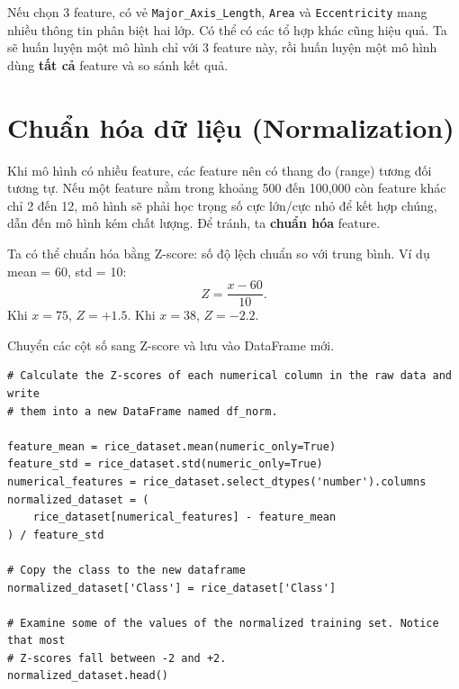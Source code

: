 \documentclass[12pt,a4paper]{article}
\begin{document}
\begin{ynghia}[title={Nhận xét}]
Nếu chọn 3 feature, có vẻ \texttt{Major\_Axis\_Length}, \texttt{Area} và \texttt{Eccentricity} mang nhiều thông tin phân biệt hai lớp.
Có thể có các tổ hợp khác cũng hiệu quả.
Ta sẽ huấn luyện một mô hình chỉ với 3 feature này, rồi huấn luyện một mô hình dùng \textbf{tất cả} feature và so sánh kết quả.
\end{ynghia}

\newpage

\section{Chuẩn hóa dữ liệu (Normalization)}

\begin{dongco}[title={Vì sao cần chuẩn hóa khi có nhiều feature?}]
Khi mô hình có nhiều feature, các feature nên có thang đo (range) tương đối tương tự.
Nếu một feature nằm trong khoảng 500 đến 100,000 còn feature khác chỉ 2 đến 12, mô hình sẽ phải học trọng số cực lớn/cực nhỏ để kết hợp chúng, dẫn đến mô hình kém chất lượng.
Để tránh, ta \textbf{chuẩn hóa} feature.
\end{dongco}

\begin{phuongphap}[title={Chuẩn hóa theo Z-score}]
Ta có thể chuẩn hóa bằng Z-score: số độ lệch chuẩn so với trung bình.
Ví dụ mean = 60, std = 10:
\[
Z = \frac{x - 60}{10}.
\]
Khi \(x=75\), \(Z=+1.5\). Khi \(x=38\), \(Z=-2.2\).
\end{phuongphap}

\begin{phuongphap}[title={Thực hiện chuẩn hóa cho dataset gạo}]
Chuyển các cột số sang Z-score và lưu vào DataFrame mới.
\end{phuongphap}

\begin{lstlisting}
# Calculate the Z-scores of each numerical column in the raw data and write
# them into a new DataFrame named df_norm.

feature_mean = rice_dataset.mean(numeric_only=True)
feature_std = rice_dataset.std(numeric_only=True)
numerical_features = rice_dataset.select_dtypes('number').columns
normalized_dataset = (
    rice_dataset[numerical_features] - feature_mean
) / feature_std

# Copy the class to the new dataframe
normalized_dataset['Class'] = rice_dataset['Class']

# Examine some of the values of the normalized training set. Notice that most
# Z-scores fall between -2 and +2.
normalized_dataset.head()
\end{lstlisting}
\end{document}
